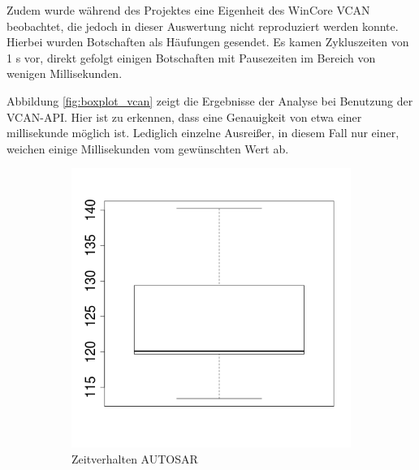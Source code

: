\documentclass[
  a4paper,					    %
  twoside,
  DIV=calc,     				%
  bibliography=totoc,
  cleardoublepage=empty,
  ngerman,     					%
  final       					%
]{scrbook}
\begin{document}
Zudem wurde während des Projektes eine Eigenheit des WinCore VCAN beobachtet, die jedoch in dieser Auswertung nicht reproduziert werden konnte. Hierbei wurden Botschaften als Häufungen gesendet. Es kamen Zykluszeiten von 1 s vor, direkt gefolgt einigen Botschaften mit Pausezeiten im Bereich von wenigen Millisekunden.

Abbildung \ref{fig:boxplot_vcan} zeigt die Ergebnisse der Analyse bei Benutzung der VCAN-API. Hier ist zu erkennen, dass eine Genauigkeit von etwa einer millisekunde möglich ist. Lediglich einzelne Ausreißer, in diesem Fall nur einer, weichen einige Millisekunden vom gewünschten Wert ab.

\begin{figure}
    \centering
    \begin{subfigure}[b]{0.49\textwidth}
        \centering
        \includegraphics[width=\textwidth]{boxplot_as}
        \caption{Zeitverhalten AUTOSAR}
        \label{fig:boxplot_as}
    \end{subfigure}
    \begin{subfigure}[b]{0.49\textwidth}
        \centering

\end{subfigure}
\end{figure}
\end{document}

